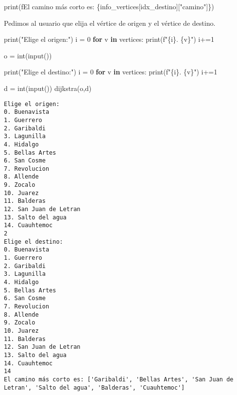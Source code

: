 \documentclass[
]{article}
\newenvironment{Shaded}{}{}
\newcommand{\BuiltInTok}[1]{#1}
\newcommand{\ControlFlowTok}[1]{\textcolor[rgb]{0.00,0.44,0.13}{\textbf{#1}}}
\newcommand{\DecValTok}[1]{\textcolor[rgb]{0.25,0.63,0.44}{#1}}
\newcommand{\KeywordTok}[1]{\textcolor[rgb]{0.00,0.44,0.13}{\textbf{#1}}}
\newcommand{\NormalTok}[1]{#1}
\newcommand{\OperatorTok}[1]{\textcolor[rgb]{0.40,0.40,0.40}{#1}}
\newcommand{\SpecialCharTok}[1]{\textcolor[rgb]{0.25,0.44,0.63}{#1}}
\newcommand{\SpecialStringTok}[1]{\textcolor[rgb]{0.73,0.40,0.53}{#1}}
\newcommand{\StringTok}[1]{\textcolor[rgb]{0.25,0.44,0.63}{#1}}
\begin{document}
\begin{Shaded}
\begin{Highlighting}[]
  \BuiltInTok{print}\NormalTok{(}\SpecialStringTok{f\textquotesingle{}El camino más corto es: }\SpecialCharTok{\{}\NormalTok{info\_vertices[idx\_destino][}\StringTok{"camino"}\NormalTok{]}\SpecialCharTok{\}}\SpecialStringTok{\textquotesingle{}}\NormalTok{)}
\end{Highlighting}
\end{Shaded}

Pedimos al usuario que elija el vértice de origen y el vértice de
destino.

\begin{Shaded}
\begin{Highlighting}[]
\BuiltInTok{print}\NormalTok{(}\StringTok{"Elige el origen:"}\NormalTok{)}
\NormalTok{i }\OperatorTok{=} \DecValTok{0}
\ControlFlowTok{for}\NormalTok{ v }\KeywordTok{in}\NormalTok{ vertices:}
  \BuiltInTok{print}\NormalTok{(}\SpecialStringTok{f"}\SpecialCharTok{\{i\}}\SpecialStringTok{. }\SpecialCharTok{\{v\}}\SpecialStringTok{"}\NormalTok{)}
\NormalTok{  i}\OperatorTok{+=}\DecValTok{1}

\NormalTok{o }\OperatorTok{=} \BuiltInTok{int}\NormalTok{(}\BuiltInTok{input}\NormalTok{())}

\BuiltInTok{print}\NormalTok{(}\StringTok{"Elige el destino:"}\NormalTok{)}
\NormalTok{i }\OperatorTok{=} \DecValTok{0}
\ControlFlowTok{for}\NormalTok{ v }\KeywordTok{in}\NormalTok{ vertices:}
  \BuiltInTok{print}\NormalTok{(}\SpecialStringTok{f"}\SpecialCharTok{\{i\}}\SpecialStringTok{. }\SpecialCharTok{\{v\}}\SpecialStringTok{"}\NormalTok{)}
\NormalTok{  i}\OperatorTok{+=}\DecValTok{1}

\NormalTok{d }\OperatorTok{=} \BuiltInTok{int}\NormalTok{(}\BuiltInTok{input}\NormalTok{())}
\NormalTok{dijkstra(o,d)}
\end{Highlighting}
\end{Shaded}

\begin{verbatim}
Elige el origen:
0. Buenavista
1. Guerrero
2. Garibaldi
3. Lagunilla
4. Hidalgo
5. Bellas Artes
6. San Cosme
7. Revolucion
8. Allende
9. Zocalo
10. Juarez
11. Balderas
12. San Juan de Letran
13. Salto del agua
14. Cuauhtemoc
2
Elige el destino:
0. Buenavista
1. Guerrero
2. Garibaldi
3. Lagunilla
4. Hidalgo
5. Bellas Artes
6. San Cosme
7. Revolucion
8. Allende
9. Zocalo
10. Juarez
11. Balderas
12. San Juan de Letran
13. Salto del agua
14. Cuauhtemoc
14
El camino más corto es: ['Garibaldi', 'Bellas Artes', 'San Juan de Letran', 'Salto del agua', 'Balderas', 'Cuauhtemoc']
\end{verbatim}
\end{document}
